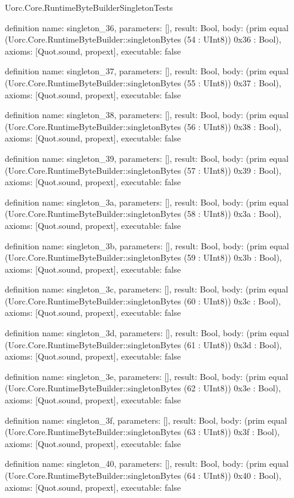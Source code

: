 \begin{lexlean}{Uorc.Core.RuntimeByteBuilderSingletonTests}
\begin{semanticmodule}
definition{
  name: singleton_36,
  parameters: [],
  result: Bool,
  body: (prim equal (Uorc.Core.RuntimeByteBuilder::singletonBytes (54 : UInt8)) 0x36 : Bool),
  axioms: [Quot.sound, propext],
  executable: false
}

definition{
  name: singleton_37,
  parameters: [],
  result: Bool,
  body: (prim equal (Uorc.Core.RuntimeByteBuilder::singletonBytes (55 : UInt8)) 0x37 : Bool),
  axioms: [Quot.sound, propext],
  executable: false
}

definition{
  name: singleton_38,
  parameters: [],
  result: Bool,
  body: (prim equal (Uorc.Core.RuntimeByteBuilder::singletonBytes (56 : UInt8)) 0x38 : Bool),
  axioms: [Quot.sound, propext],
  executable: false
}

definition{
  name: singleton_39,
  parameters: [],
  result: Bool,
  body: (prim equal (Uorc.Core.RuntimeByteBuilder::singletonBytes (57 : UInt8)) 0x39 : Bool),
  axioms: [Quot.sound, propext],
  executable: false
}

definition{
  name: singleton_3a,
  parameters: [],
  result: Bool,
  body: (prim equal (Uorc.Core.RuntimeByteBuilder::singletonBytes (58 : UInt8)) 0x3a : Bool),
  axioms: [Quot.sound, propext],
  executable: false
}

definition{
  name: singleton_3b,
  parameters: [],
  result: Bool,
  body: (prim equal (Uorc.Core.RuntimeByteBuilder::singletonBytes (59 : UInt8)) 0x3b : Bool),
  axioms: [Quot.sound, propext],
  executable: false
}

definition{
  name: singleton_3c,
  parameters: [],
  result: Bool,
  body: (prim equal (Uorc.Core.RuntimeByteBuilder::singletonBytes (60 : UInt8)) 0x3c : Bool),
  axioms: [Quot.sound, propext],
  executable: false
}

definition{
  name: singleton_3d,
  parameters: [],
  result: Bool,
  body: (prim equal (Uorc.Core.RuntimeByteBuilder::singletonBytes (61 : UInt8)) 0x3d : Bool),
  axioms: [Quot.sound, propext],
  executable: false
}

definition{
  name: singleton_3e,
  parameters: [],
  result: Bool,
  body: (prim equal (Uorc.Core.RuntimeByteBuilder::singletonBytes (62 : UInt8)) 0x3e : Bool),
  axioms: [Quot.sound, propext],
  executable: false
}

definition{
  name: singleton_3f,
  parameters: [],
  result: Bool,
  body: (prim equal (Uorc.Core.RuntimeByteBuilder::singletonBytes (63 : UInt8)) 0x3f : Bool),
  axioms: [Quot.sound, propext],
  executable: false
}

definition{
  name: singleton_40,
  parameters: [],
  result: Bool,
  body: (prim equal (Uorc.Core.RuntimeByteBuilder::singletonBytes (64 : UInt8)) 0x40 : Bool),
  axioms: [Quot.sound, propext],
  executable: false
}


\end{semanticmodule}
\end{lexlean}
